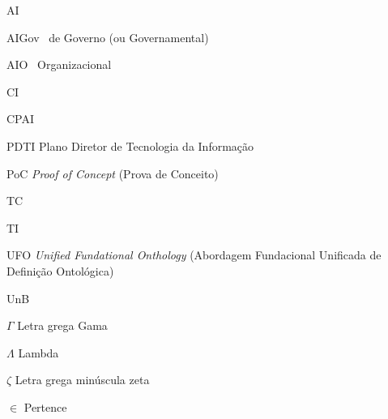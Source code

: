 
\begin{siglas}
    \item[AI]     \AI
    \item[AIGov]  \AI\ de Governo (ou Governamental)
    \item[AIO]    \AI\ Organizacional
    \item[CI]     \CI
    \item[CPAI]   \CPAI
    \item[PDTI]   Plano Diretor de Tecnologia da Informação
    \item[PoC]    \emph{Proof of Concept} (Prova de Conceito)
    \item[TC]     \tr 
    \item[TI]     \TI
    \item[UFO]    \emph{Unified Fundational Onthology} (Abordagem Fundacional Unificada de Definição Ontológica)
    \item[UnB]    \UnB
\end{siglas}



\begin{simbolos}
  \item[$ \Gamma $] Letra grega Gama
  \item[$ \Lambda $] Lambda
  \item[$ \zeta $] Letra grega minúscula zeta
  \item[$ \in $] Pertence
\end{simbolos}
